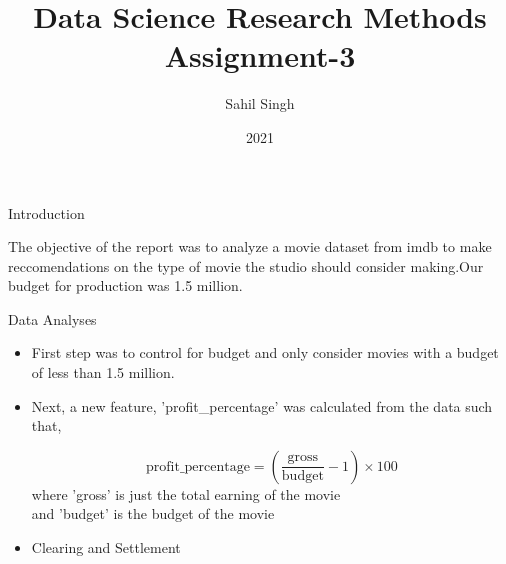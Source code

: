 \documentclass{beamer}
\title{Data Science Research Methods Assignment-3}
\author{Sahil Singh}
\institute{University of Sussex}
\date{2021}
\begin{document}
\frame{\titlepage}

\begin{frame}{Introduction}

The objective of the report was to analyze a movie dataset from imdb to make reccomendations on the type of movie the studio should consider making.Our budget for production was 1.5 million.

\end{frame}
\begin{frame}{Data Analyses}
\begin{itemize}
    \item First step was to control for budget and only consider movies with a budget of less than 1.5 million.
    \item Next, a new feature, 'profit\_percentage' was calculated from the data such that,\\
    \begin{tcolorbox}[colback=red!5,colframe=green!75!black,title=]
	    $$\text{profit\_percentage}=\left(\frac{\text{gross}}{\text{budget}}-1\right)\times100$$
	    \tcblower
	    where 'gross' is just the total earning of the movie\\
	    and 'budget' is the budget of the movie
\end{tcolorbox} 

    \item Clearing and Settlement
	\\[1ex]
\end{itemize}

%
%
%
%


\end{frame}
\end{document}
